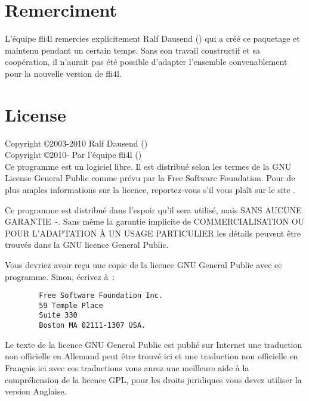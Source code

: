 \section{Remerciment}

L'équipe fli4l remercies explicitement Ralf Dausend ()
qui a créé ce paquetage et maintenu pendant un certain temps. Sans son travail
constructif et sa coopération, il n'aurait pas été possible d'adapter l'ensemble
convenablement pour la nouvelle version de fli4l.

\section{License}

Copyright \copyright  2003-2010 Ralf Dausend () \\
Copyright \copyright  2010-     Par l'équipe fli4l () \\

Ce programme est un logiciel libre. Il est distribué selon les termes
de la GNU License General Public comme prévu par la Free Software Foundation.
Pour de plus amples informations sur la licence, reportez-vous
s'il vous plaît sur le site .

Ce programme est distribué dans l'espoir qu'il sera utilisé, mais SANS AUCUNE
GARANTIE~-. Sans même la garantie implicite de COMMERCIALISATION OU POUR
L'ADAPTATION À UN USAGE PARTICULIER les détails peuvent être trouvés dans
la GNU licence General Public.

Vous devriez avoir reçu une copie de la licence GNU General Public avec ce
programme. Sinon, écrivez à~:

\begin{verbatim}
		Free Software Foundation Inc.
		59 Temple Place
		Suite 330
		Boston MA 02111-1307 USA.
\end{verbatim}

Le texte de la licence GNU General Public est publié sur Internet
 une traduction non officielle en
Allemand peut être trouvé ici 
et une traduction non officielle en Français ici 
avec ces traductions vous aurez une meilleure aide à la compréhension de la
licence GPL, pour les droits juridiques vous devez utiliser la version Anglaise.